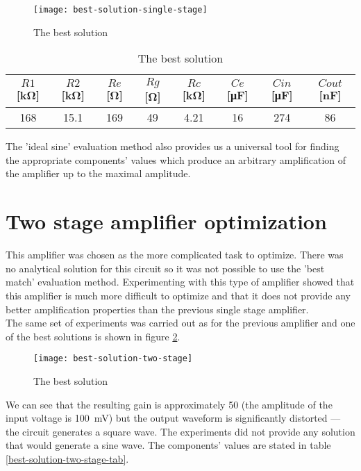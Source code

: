 \begin{figure}[H]
    \centerline{\texttt{[image: best-solution-single-stage]}\label{better-solution-fig}}
    \caption{The best solution}
\end{figure}

\begin{table}[H]
\centering
\begin{tabular}{@{}cccccccc@{}}
\toprule
    $R1$ [\si{\kilo\ohm}] & $R2$ [\si{\kilo\ohm}] & $Re$ [\si{\ohm}] & $Rg$ [\si{\ohm}] & $Rc$ [\si{\kilo\ohm}] & $Ce$ [\si{\micro\farad}] & $Cin$ [\si{\micro\farad}] & $Cout$ [\si{\nano\farad}] \\
    \midrule
    168 & 15.1 & 169 & 49 & 4.21 & 16 & 274 & 86 \\
    \bottomrule
\end{tabular}
\caption{The best solution}
\label{better-solution-tab}
\end{table}

The 'ideal sine' evaluation method also provides us a universal tool for finding the appropriate components' values which produce an arbitrary amplification of the amplifier up to the maximal amplitude.

\section{Two stage amplifier optimization} \label{2stage-results}
This amplifier was chosen as the more complicated task to optimize. There was no analytical solution for this circuit so it was not possible to use the 'best match' evaluation method. Experimenting with this type of amplifier showed that this amplifier is much more difficult to optimize and that it does not provide any better amplification properties than the previous single stage amplifier.\\
The same set of experiments was carried out as for the previous amplifier and one of the best solutions is shown in figure \ref{best-solution-two-stage-fig}.\\

\begin{figure}[H]
    \centerline{\texttt{[image: best-solution-two-stage]}\label{best-solution-two-stage-fig}}
    \caption{The best solution}
\end{figure}

We can see that the resulting gain is approximately 50 (the amplitude of the input voltage is \SI{100}{\milli\volt}) but the output waveform is significantly distorted --- the circuit generates a square wave. The experiments did not provide any solution that would generate a sine wave. The components' values are stated in table \ref{best-solution-two-stage-tab}.

